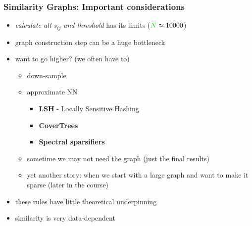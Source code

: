 \documentclass{beamer}
\begin{document}
\begin{frame}
\frametitle{Similarity Graphs: Important considerations}

\begin{itemize}[<+-| alert@+>]%
\item \emph{calculate all $s_{ij}$ and threshold} has its limits ($\nodes \approx 10000$)  
\item graph construction step can be a huge bottleneck
\item want to go higher? (we often have to)
\begin{itemize}
\item down-sample
\item approximate NN 
\begin{itemize}
\item \textbf{LSH} - Locally Sensitive Hashing
\item \textbf{CoverTrees} 
\item \textbf{Spectral sparsifiers} 
\end{itemize}
\item sometime we may not need the graph (just the final results)
\item yet another story: when we start with a large graph and want to make it sparse (later in the course)
\end{itemize}
\item these rules have little theoretical underpinning 
\item similarity is very data-dependent 
\end{itemize}
\end{frame}








\MakeLastSlide
\end{document}
